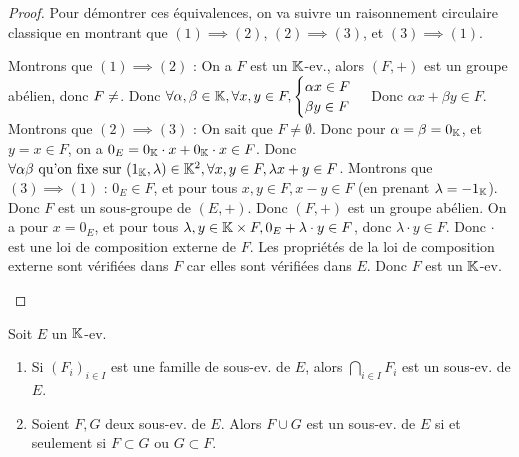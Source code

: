 \documentclass[12pt,a4paper]{report}
\begin{document}
\begin{proof}
    Pour démontrer ces équivalences, on va suivre un raisonnement circulaire classique en montrant que $(1) \implies (2)$, $(2) \implies (3)$, et $(3) \implies (1)$.

    \begin{outline}
        \1 Montrons que $(1) \implies (2)$ :
            \2 On a $F$ est un $\mathbb{K}$-ev., alors $(F,+)$ est un groupe abélien, donc $F \neq \empty$.
            \2 Donc $\forall \alpha,\beta \in \mathbb{K},\forall x,y \in F, \begin{cases}
            \alpha x \in F\\
            \beta y \in F
            \end{cases}$
            \2 Donc $\alpha x + \beta y \in F$.
        \1 Montrons que $(2) \implies (3)$ :
            \2 On sait que $F \neq \emptyset$.
            \2 Donc pour $\alpha = \beta = 0_{\mathbb{K}}$, et $y = x \in F$, on a $0_E = 0_{\mathbb{K}} \cdot x + 0_{\mathbb{K}} \cdot x \in F$.
            \2 Donc $\forall \alpha \beta \text{ qu'on fixe sur } (1_{\mathbb{K}},\lambda) \in\mathbb{K}^2, \forall x,y \in F, \lambda x + y \in F$.
        \1 Montrons que $(3) \implies (1)$ :
            \2 $0_E \in F$, et pour tous $x,y \in F, x-y \in F$ (en prenant $\lambda = -1_{\mathbb{K}}$).
            \2 Donc $F$ est un sous-groupe de $(E,+)$.
            \2 Donc $(F,+)$ est un groupe abélien.
            \2 On a pour $x = 0_E$, et pour tous $\lambda, y \in \mathbb{K}\times F, 0_E + \lambda \cdot y \in F$, donc $\lambda \cdot y \in F$.
            \2 Donc $\cdot$ est une loi de composition externe de $F$.
            \2 Les propriétés de la loi de composition externe sont vérifiées dans $F$ car elles sont vérifiées dans $E$.
            \2 Donc $F$ est un $\mathbb{K}$-ev.
    \end{outline}
\end{proof}

\begin{property}
    Soit $E$ un $\mathbb{K}$-ev.
    \begin{enumerate}
        \item Si $(F_i)_{i\in I}$ est une famille de sous-ev. de $E$, alors $\bigcap_{i\in I} F_i$ est un sous-ev. de $E$.
        \item Soient $F,G$ deux sous-ev. de $E$. Alors $F \cup G$ est un sous-ev. de $E$ si et seulement si $F \subset G$ ou $G \subset F$.
    \end{enumerate}
\end{property}
\end{document}
